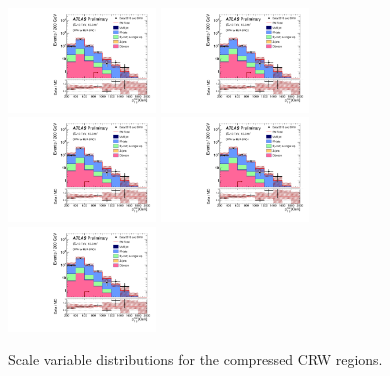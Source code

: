 \begin{figure}[tbph]
\begin{center}
\includegraphics[width=0.35\textwidth]{figures/ATLAS-CONF-2016-078_INT/N-1Plots/AtlasStyle/Preliminary/CRW_SRJigsawSRC1_LastCut_CRW_minusone}
\includegraphics[width=0.35\textwidth]{figures/ATLAS-CONF-2016-078_INT/N-1Plots/AtlasStyle/Preliminary/CRW_SRJigsawSRC2_LastCut_CRW_minusone}
\includegraphics[width=0.35\textwidth]{figures/ATLAS-CONF-2016-078_INT/N-1Plots/AtlasStyle/Preliminary/CRW_SRJigsawSRC3_LastCut_CRW_minusone}
\includegraphics[width=0.35\textwidth]{figures/ATLAS-CONF-2016-078_INT/N-1Plots/AtlasStyle/Preliminary/CRW_SRJigsawSRC4_LastCut_CRW_minusone}
\includegraphics[width=0.35\textwidth]{figures/ATLAS-CONF-2016-078_INT/N-1Plots/AtlasStyle/Preliminary/CRW_SRJigsawSRC5_LastCut_CRW_minusone}
\end{center}
\caption{Scale variable distributions for the compressed CRW regions.}
\label{fig:CRW_SRJigsawSRC3_LastCut_CRW_minusone}
\end{figure}

